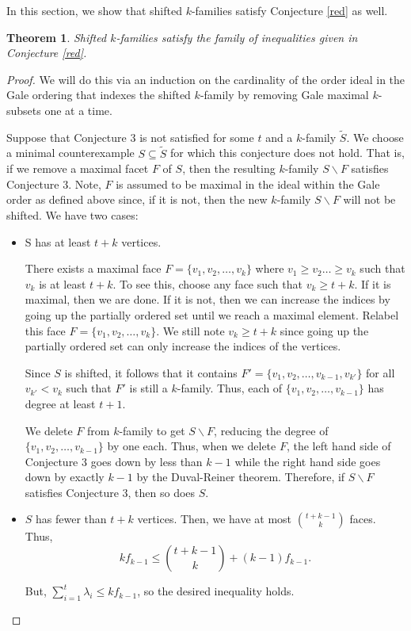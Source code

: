 \documentclass[11pt]{article}
\newtheorem{thm}[lm]{Theorem}
\begin{document}
In this section, we show that shifted $k$-families satisfy Conjecture \ref{red} as well.

\begin{thm}\label{thm:shifted}
Shifted $k$-families satisfy the family of inequalities given in Conjecture \ref{red}.
\end{thm}


\begin{proof}
We will do this via an induction on the cardinality of the order ideal in the Gale ordering that indexes the shifted $k$-family by removing Gale maximal $k$-subsets one at a time.

Suppose that Conjecture 3 is not satisfied for some $t$ and a $k$-family $\tilde{S}$. We choose a minimal counterexample $S \subseteq \tilde{S}$ for which this conjecture does not hold. That is, if we remove a maximal facet $F$ of $S$, then the resulting $k$-family $S \backslash F$ satisfies Conjecture 3. Note, $F$ is assumed to be maximal in the ideal within the Gale order as defined above since, if it is not, then the new $k$-family $S \backslash F$ will not be shifted. We have two cases:

\begin{itemize}
\item[Case 1.] S has at least $t + k$ vertices.

There exists a maximal face $F = \{v_1, v_2, \ldots, v_k\}$ where $v_1 \geq v_2 \ldots \geq v_k$ such that $v_k$ is at least $t + k$.
To see this, choose any face such that $v_k \geq t + k$. If it is maximal, then we are done. If it is not, then we can increase the indices by going up the partially ordered set until we reach a maximal element. Relabel this face $ F = \{v_1, v_2, \ldots, v_k\}$. We still note $v_k \geq t + k$ since going up the partially ordered set can only increase the indices of the vertices.

Since $S$ is shifted, it follows that it contains $F' = \{v_1, v_2, \ldots, v_{k -1}, v_{k'}\}$ for all $v_{k'} < v_k$ such that $F'$ is still a $k$-family. Thus, each of $\{v_1, v_2, \ldots, v_{k-1}\}$ has degree at least $t+ 1$.

We delete $F$ from $k$-family to get $S \backslash F$, reducing the degree of $\{v_1, v_2, \ldots, v_{k - 1}\}$ by one each. Thus, when we delete $F$, the left hand side of Conjecture 3 goes down by less than $k - 1$ while the right hand side goes down by exactly $k - 1$ by the Duval-Reiner theorem. Therefore, if $S \backslash F$ satisfies Conjecture 3, then so does $S$.

\item[Case 2.] $S$ has fewer than $t + k$ vertices. Then, we have at most $\binom{t+k - 1}{k}$ faces. Thus,
$$k f_{k - 1} \leq \binom{t + k - 1}{k} + (k - 1) f_{k - 1}.$$

But, $\sum_{i = 1}^t \lambda_i \leq k f_{k - 1}$, so the desired inequality holds.

\end{itemize}
\end{proof}
\end{document}
